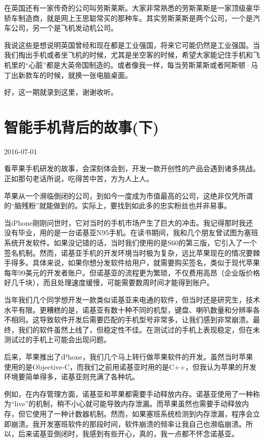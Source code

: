 \documentclass[
  letterpaper,
  DIV=11,
  numbers=noendperiod]{scrreprt}
\begin{document}
在英国还有一家传奇的公司叫劳斯莱斯。大家非常熟悉的劳斯莱斯是一家顶级豪华轿车制造商，就是网上王思聪常买的那种车。其实劳斯莱斯是两个公司，一个是汽车公司，另一个是飞机发动机公司。

我说这些是想说明英国曾经和现在都是工业强国，将来它可能仍然是工业强国。当我们掏出手机或者坐飞机的时候，尤其是坐空客的时候，希望大家能记住手机和飞机里的``心脏''都是大英帝国制造的。或者像我一样，每当劳斯莱斯或者阿斯顿·马丁出新款车的时候，就换一张电脑桌面。

好，这一期就录到这里，谢谢收听。


\chapter{智能手机背后的故事(下)}\label{ux667aux80fdux624bux673aux80ccux540eux7684ux6545ux4e8bux4e0b}

2016-07-01

看苹果手机研发的故事，会深刻体会到，开发一款开创性的产品会遇到诸多挑战。正如那句老话所说，吃得苦中苦，方为人上人。

苹果从一个濒临倒闭的公司，到如今一度成为市值最高的公司，这绝非仅凭所谓的``脑残粉''就能做到的。实际上，要找到如此多的忠实粉丝也并非易事。

当iPhone刚刚问世时，它对当时的手机市场产生了巨大的冲击。我记得那时我还没有毕业，用的是一台诺基亚N95手机。在读书期间，我和几个朋友曾试图为塞班系统开发软件。如果没记错的话，当时我们使用的是S60的第三版，它引入了一个签名机制。然而，诺基亚手机的开发环境当时极为复杂，远比苹果现在的情况要棘手得多。具体来说，如果你想分发软件给用户，就需要购买签名，类似于现代苹果每年99美元的开发者账户。但诺基亚的流程更为繁琐，不仅费用高昂（企业版价格好几千块），而且处理速度缓慢，可能需要数周时间才能得到账户。

当年我们几个同学想开发一款类似诺基亚来电通的软件，但当时还是研究生，技术水平有限。更糟糕的是，诺基亚有数十种不同的机型，键盘、喇叭数量和分辨率各不相同。这导致软件开发后需要匹配的手机型号非常多，让我们感到非常崩溃。最终，我们的软件虽然上线了，但稳定性不佳。在测试过的手机上表现稳定，但在未测试过的手机上可能会出现问题。

后来，苹果推出了iPhone，我们几个马上转行做苹果软件的开发。虽然当时苹果使用的是Objective-C，而我们之前用诺基亚时用的是C++，但我认为苹果的开发环境要简单得多，诺基亚则充满了各种坑。

例如，在内存管理方面，诺基亚和苹果都需要手动释放内存。诺基亚使用了一种称为``live''的机制，稍不小心就可能导致内存泄漏。而苹果虽然也需要手动释放内存，但它使用了一种计数器机制。然而，如果塞班系统检测到内存泄漏，程序会立即崩溃。我开发塞班软件的那段时间，软件崩溃的频率让我自己也濒临崩溃。所以，后来诺基亚倒闭时，我感到有些开心，真的，我一点都不怀念诺基亚。
\end{document}

